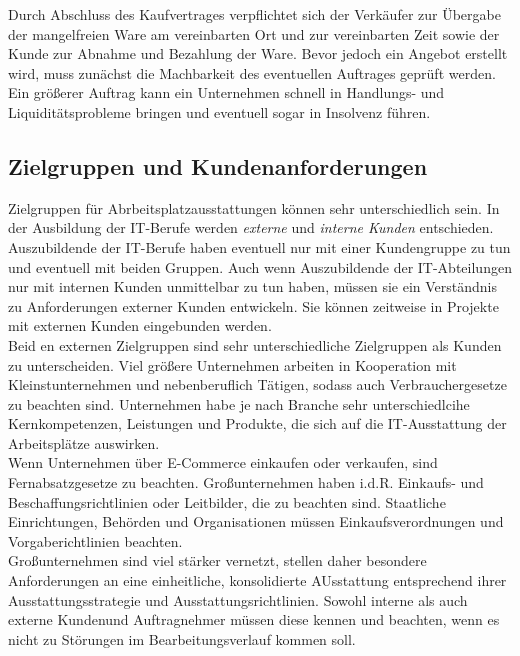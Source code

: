 \documentclass[a4paper, 12pt]{report}
\begin{document}
Durch Abschluss des Kaufvertrages verpflichtet sich der Verkäufer zur Übergabe
der mangelfreien Ware am vereinbarten Ort und zur vereinbarten Zeit sowie der
Kunde zur Abnahme und Bezahlung der Ware. Bevor jedoch ein Angebot erstellt
wird, muss zunächst die Machbarkeit des eventuellen Auftrages geprüft werden.
Ein größerer Auftrag kann ein Unternehmen schnell in Handlungs- und
Liquiditätsprobleme bringen und eventuell sogar in Insolvenz führen.

\subsection{Zielgruppen und Kundenanforderungen}

Zielgruppen für Abrbeitsplatzausstattungen können sehr unterschiedlich sein. In
der Ausbildung der IT-Berufe werden \emph{externe} und \emph{interne Kunden}
entschieden. Auszubildende der IT-Berufe haben eventuell nur mit einer
Kundengruppe zu tun und eventuell mit beiden Gruppen. Auch wenn Auszubildende
der IT-Abteilungen nur mit internen Kunden unmittelbar zu tun haben, müssen sie
ein Verständnis zu Anforderungen externer Kunden entwickeln. Sie können
zeitweise in Projekte mit externen Kunden eingebunden werden. \\

Beid en externen Zielgruppen sind sehr unterschiedliche Zielgruppen als Kunden
zu unterscheiden. Viel größere Unternehmen arbeiten in Kooperation mit
Kleinstunternehmen und nebenberuflich Tätigen, sodass auch Verbrauchergesetze zu
beachten sind. Unternehmen habe je nach Branche sehr unterschiedlcihe
Kernkompetenzen, Leistungen und Produkte, die sich auf die IT-Ausstattung der
Arbeitsplätze auswirken. \\

Wenn Unternehmen über E-Commerce einkaufen oder verkaufen, sind
Fernabsatzgesetze zu beachten. Großunternehmen haben i.d.R. Einkaufs- und
Beschaffungsrichtlinien oder Leitbilder, die zu beachten sind. Staatliche
Einrichtungen, Behörden und Organisationen müssen Einkaufsverordnungen und
Vorgaberichtlinien beachten. \\

Großunternehmen sind viel stärker vernetzt, stellen daher besondere
Anforderungen an eine einheitliche, konsolidierte AUsstattung entsprechend ihrer
Ausstattungsstrategie und Ausstattungsrichtlinien. Sowohl interne als auch
externe Kundenund Auftragnehmer müssen diese kennen und beachten, wenn es nicht
zu Störungen im Bearbeitungsverlauf kommen soll.
\end{document}
